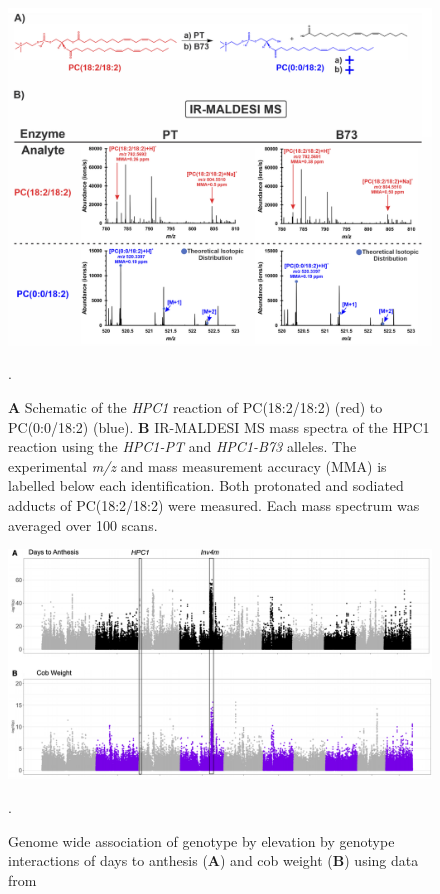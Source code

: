 \documentclass[9pt,twocolumn,twoside,lineno]{biorxiv}
\newcommand{\hpc}{\textit{HPC1}\xspace}
\begin{document}
\clearpage

\begin{figure}[t]
\begin{center}
\includegraphics[width=0.6 \paperwidth]{Sup_Figures/Sup_Fig_8.png}
\caption{ \textbf{A} Schematic of the \hpc reaction of PC(18:2/18:2) (red) to
PC(0:0/18:2) (blue). 
\textbf{B} IR-MALDESI MS mass spectra of the HPC1 reaction using the \textit{HPC1-PT} and \textit{HPC1-B73} alleles. The
experimental \textit{m/z} and mass measurement accuracy (MMA) is labelled below each
identification. Both protonated and sodiated adducts of PC(18:2/18:2) were measured. 
Each mass spectrum was averaged over 100 scans.}.
\label{figure:Sup:MS_spectra}
\end{center}
\end{figure} 

\clearpage

\begin{figure}[t]
\begin{center}
\includegraphics[width=0.8 \paperwidth]{Sup_Figures/Sup_Fig_9.png}
\caption{Genome wide association of genotype by elevation by genotype interactions of days to anthesis (\textbf{A}) and cob weight (\textbf{B}) using data from \cite{Gates2019-xu}}.
\label{figure:Sup:GxE_scan}
\end{center}
\end{figure} 
\end{document}
